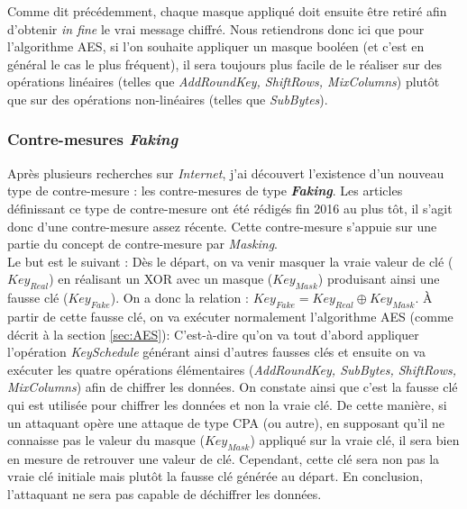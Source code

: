 \documentclass[10pt, oneside, a4paper]{article}
\begin{document}
Comme dit précédemment, chaque masque appliqué doit ensuite être retiré afin d'obtenir \textit{in fine} le vrai message chiffré. Nous retiendrons donc ici que pour l'algorithme AES, si l'on souhaite appliquer un masque booléen (et c'est en général le cas le plus fréquent), il sera toujours plus facile de le réaliser sur des opérations linéaires (telles que \textit{AddRoundKey, ShiftRows, MixColumns}) plutôt que sur des opérations non-linéaires (telles que \textit{SubBytes}).


\subsubsection{Contre-mesures \textit{Faking}}

Après plusieurs recherches sur \textit{Internet}, j'ai découvert l'existence d'un nouveau type de contre-mesure : les contre-mesures de type \textbf{\textit{Faking}}. Les articles définissant ce type de contre-mesure ont été rédigés fin 2016 au plus tôt, il s'agit donc d'une contre-mesure assez récente. Cette contre-mesure s'appuie sur une partie du concept de contre-mesure par \textit{Masking}. \\ Le but est le suivant : Dès le départ, on va venir masquer la vraie valeur de clé ($Key_{Real}$) en réalisant un XOR avec un masque ($Key_{Mask}$) produisant ainsi une fausse clé ($Key_{Fake}$). On a donc la relation : $Key_{Fake} = Key_{Real} \oplus Key_{Mask}$. À partir de cette fausse clé, on va exécuter normalement l'algorithme AES (comme décrit à la section \ref{sec:AES}): C'est-à-dire qu'on va tout d'abord appliquer l'opération \textit{KeySchedule} générant ainsi d'autres fausses clés et ensuite on va exécuter les quatre opérations élémentaires (\textit{AddRoundKey, SubBytes, ShiftRows, MixColumns}) afin de chiffrer les données. On constate ainsi que c'est la fausse clé qui est utilisée pour chiffrer les données et non la vraie clé. De cette manière, si un attaquant opère une attaque de type CPA (ou autre), en supposant qu'il ne connaisse pas le valeur du masque ($Key_{Mask}$) appliqué sur la vraie clé, il sera bien en mesure de retrouver une valeur de clé. Cependant, cette clé sera non pas la vraie clé initiale mais plutôt la fausse clé générée au départ. En conclusion, l'attaquant ne sera pas capable de déchiffrer les données.
\end{document}

